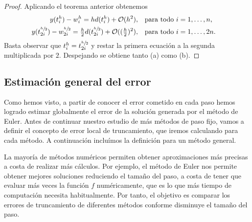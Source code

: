 \begin{proof}
    \newcommand{\hh}{\sfrac{h}{2}}

    Aplicando el teorema anterior obtenemos
    \begin{align*}
        y(t_i^h) - w_i^h = hd(t_i^h) + \vo(h^2),
            & \qq{para todo $i = 1,\ldots,n$,} \\
        y(t_{2i}^{\hh}) - w_{2i}^{\hh} = \tfrac{h}{2}d(t_{2i}^{\hh})
            + \vo((\tfrac{h}{2})^2),
            & \qq{para todo $i = 1,\ldots,2n$.}
    \end{align*}
    Basta observar que $t_i^h = t_{2i}^{\hh}$
    y restar la primera ecuación a la segunda multiplicada por $2$.
    Despejando se obtiene tanto (a) como (b).
\end{proof}

\subsection{Estimación general del error}

Como hemos visto, a partir de conocer el error cometido en cada paso
hemos logrado estimar globalmente
el error de la solución generada por el método de Euler.
Antes de continuar nuestro estudio de más métodos de paso fijo,
vamos a definir el concepto de error local de truncamiento,
que iremos calculando para cada método.
A continuación incluímos la definición para un método general.



La mayoría de métodos numéricos permiten obtener aproximaciones más precisas
a costa de realizar más cálculos.
Por ejemplo, el método de Euler nos permite
obtener mejores soluciones reduciendo el tamaño del paso,
a costa de tener que evaluar más veces la función $f$ numéricamente,
que es lo que más tiempo de computación necesita habitualmente.
Por tanto, el objetivo es
comparar los errores de truncamiento de diferentes métodos
conforme disminuye el tamaño del paso.

